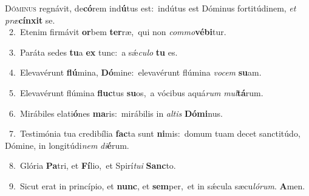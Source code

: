 \lettrine{\initial\textcolor{\initialcolor}{D}}{óminus} regnávit, de\-\textbf{có}\-rem ind\-\textbf{ú}\-tus est:~\star indútus est Dóminus fortitúdinem, \textit{et} \textit{præ}\-\textbf{cín}\textbf{xit} se.\\
{\numbfont\textcolor{\numbcolor}{~2.}}~Etenim firmávit \textbf{or}\-bem \textbf{ter}\-ræ,~\star qui non \textit{com}\-\textit{mo}\textbf{vé}\textbf{bi}tur.\par
{\numbfont\textcolor{\numbcolor}{~3.}}~Paráta sedes \textbf{tu}\-a \textbf{ex} tunc:~\star a sǽ\-\textit{cu}\-\textit{lo} \textbf{tu} es.\par
{\numbfont\textcolor{\numbcolor}{~4.}}~Elevavérunt \textbf{flú}\-mina, \textbf{Dó}\-mine:~\star elevavérunt flúmina \textit{vo}\-\textit{cem} \textbf{su}\-am.\par
{\numbfont\textcolor{\numbcolor}{~5.}}~Elevavérunt flúmina \textbf{fluc}\-tus \textbf{su}\-os,~\star a vócibus aquá\textit{rum} \textit{mul}\-\textbf{tá}rum.\par
{\numbfont\textcolor{\numbcolor}{~6.}}~Mirábiles elati\-\textbf{ó}\-nes \textbf{ma}\-ris:~\star mirábilis in \textit{al}\-\textit{tis} \textbf{Dó}\-\textbf{mi}nus.\par
{\numbfont\textcolor{\numbcolor}{~7.}}~Testimónia tua credibília \textbf{fac}\-ta sunt \textbf{ni}\-mis:~\star domum tuam decet sanctitúdo, Dómine, in longitúdi\textit{nem} \textit{di}\-\textbf{é}rum.\par
{\numbfont\textcolor{\numbcolor}{~8.}}~Glória \textbf{Pa}\-tri, et \textbf{Fí}\-lio,~\star et Spirí\-\textit{tu}\-\textit{i} \textbf{Sanc}\-to.\par
{\numbfont\textcolor{\numbcolor}{~9.}}~Sicut erat in princípio, et \textbf{nunc}\-, et \textbf{sem}\-per,~\star et in sǽcula sæcu\-\textit{ló}\-\textit{rum}. \textbf{A}\-men.\par
